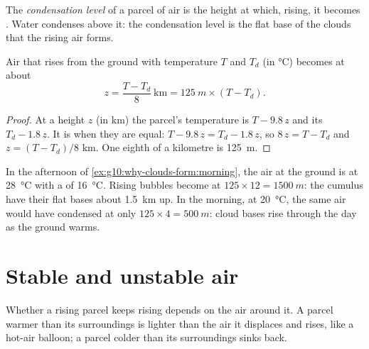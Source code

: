 \begin{definition}\label{def:g10:why-clouds-form:condensation-level}
The \emph{condensation level} of a parcel of air
is the height at which, rising, it becomes . Water condenses above
it: the condensation level is the flat base of the clouds that the rising
air forms.
\end{definition}

\begin{proposition}\label{prop:g10:why-clouds-form:lcl}
Air that rises from the ground with temperature $T$ and  $T_d$
(in \unit{\degreeCelsius}) becomes  at about
\[
  z = \frac{T - T_d}{8}\ \text{km} = \qty{125}{m} \times (T - T_d).
\]
\end{proposition}

\begin{proof}
At a height $z$ (in km) the parcel's temperature is $T - 9.8\,z$ and its
 $T_d - 1.8\,z$. It is  when they are equal:
$T - 9.8\,z = T_d - 1.8\,z$, so $8\,z = T - T_d$ and $z = (T - T_d)/8$ km.
One eighth of a kilometre is \qty{125}{m}.
\end{proof}

\begin{example}\label{ex:g10:why-clouds-form:base}
In the afternoon of \cref{ex:g10:why-clouds-form:morning}, the air at the
ground is at \qty{28}{\degreeCelsius} with a  of
\qty{16}{\degreeCelsius}. Rising bubbles become  at
$125 \times 12 = \qty{1500}{m}$: the cumulus have their flat bases about
\qty{1.5}{km} up. In the morning, at \qty{20}{\degreeCelsius}, the same air
would have condensed at only $125 \times 4 = \qty{500}{m}$: cloud bases rise
through the day as the ground warms.
\end{example}

\section{Stable and unstable air}

Whether a rising parcel keeps rising depends on the air around it. A parcel
warmer than its surroundings is lighter than the air it displaces and rises,
like a hot-air balloon; a parcel colder than its surroundings sinks back.

